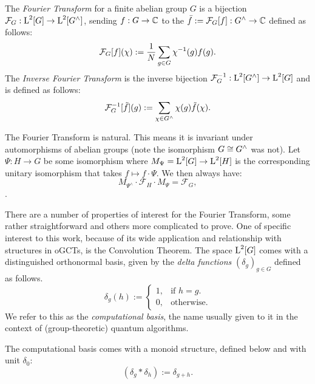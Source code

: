 \begin{defn}
The \emph{Fourier Transform} for a finite abelian group $G$ is a bijection $\mathcal{F}_G:\operatorname{L}^2[G]\rightarrow\operatorname{L}^2[G^\wedge]$, sending $f:G\to\mathbb{C}$ to the $\bar{f}:=\mathcal{F}_G[f]:G^\wedge\to\mathbb{C}$ defined as follows:
\begin{equation}\label{eqn_DefTraditionalFT}
  \mathcal{F}_G[f](\chi) := \frac{1}{N}\sum_{g \in G}\chi^{-1}(g)f(g).
\end{equation}
The \emph{Inverse Fourier Transform} is the inverse bijection $\mathcal{F}_G^{-1}: \operatorname{L}^2[G^\wedge] \rightarrow \operatorname{L}^2[G]$ and is defined as follows:
\begin{equation}\label{eqn_DefTraditionalInverseFT}
  \mathcal{F}_G^{-1}[\tilde{f}](g) := \sum_{\chi \in G^\wedge}\chi(g)\tilde{f}(\chi).
\end{equation}
\end{defn}

The Fourier Transform is natural.  This means it is invariant under automorphisms of abelian groups (note the isomorphism $G \cong G^\wedge$ was not). Let $\Psi : H \rightarrow G$ be some isomorphism where $M_\Psi = \operatorname{L}^2[G] \rightarrow \operatorname{L}^2[H]$ is the corresponding unitary isomorphism that takes $f\mapsto f\cdot \Psi$. We then always have:
\begin{equation}\label{eqn_FTcanonicity}
  M_{\Psi^\wedge} \cdot \mathcal{F}_H \cdot M_\Psi =  \mathcal{F}_G,
\end{equation}
.

There are a number of properties of interest for the Fourier Transform, some rather straightforward and others more complicated to prove. One of specific interest to this work, because of its wide application and relationship with structures in oGCTs, is the Convolution Theorem. The space $\operatorname{L}^2[G]$ comes with a distinguished orthonormal basis, given by the \emph{delta functions} $(\delta_g)_{g\in G}$ defined as follows.
\begin{equation}
\label{eqn_computationalBasis}
  \delta_g(h):=\begin{cases}
    1, & \text{if $h=g$}.\\
    0, & \text{otherwise}.
  \end{cases}
\end{equation}
We refer to this as the \emph{computational basis}, the name usually given to it in the context of (group-theoretic) quantum algorithms.

The computational basis comes with a monoid structure, defined below and with unit $\delta_0$:
\begin{equation*}
  \left(\delta_g*\delta_h\right):=\delta_{g+h}.
\end{equation*}

